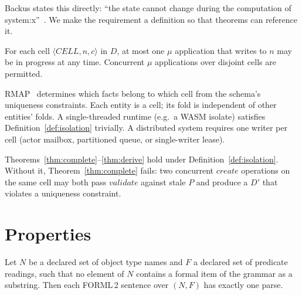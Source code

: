 \documentclass[acmsmall,screen,review]{acmart}
\begin{document}
Backus states this directly: ``the state cannot change during the computation of system:x''~\cite[Sec.\,14.6(c)]{backus78}. We make the requirement a definition so that theorems can reference it.

\begin{definition}\label{def:isolation}
For each cell $\langle\mathit{CELL}, n, c\rangle$ in $D$, at most one $\mu$ application that writes to $n$ may be in progress at any time. Concurrent $\mu$ applications over disjoint cells are permitted.
\end{definition}

\noindent RMAP~\cite[Ch.\,17]{halpin08} determines which facts belong to which cell from the schema's uniqueness constraints. Each entity is a cell; its fold is independent of other entities' folds. A single-threaded runtime (e.g.\ a WASM isolate) satisfies Definition~\ref{def:isolation} trivially. A distributed system requires one writer per cell (actor mailbox, partitioned queue, or single-writer lease).

Theorems~\ref{thm:complete}--\ref{thm:derive} hold under Definition~\ref{def:isolation}. Without it, Theorem~\ref{thm:complete} fails: two concurrent $\mathit{create}$ operations on the same cell may both pass $\mathit{validate}$ against stale $P$ and produce a $D'$ that violates a uniqueness constraint.

\section{Properties}

\begin{theorem}\label{thm:grammar}
Let $N$ be a declared set of object type names and $F$ a declared set of predicate readings, such that no element of $N$ contains a formal item of the grammar as a substring. Then each FORML\,2 sentence over $(N, F)$ has exactly one parse.
\end{theorem}
\end{document}
